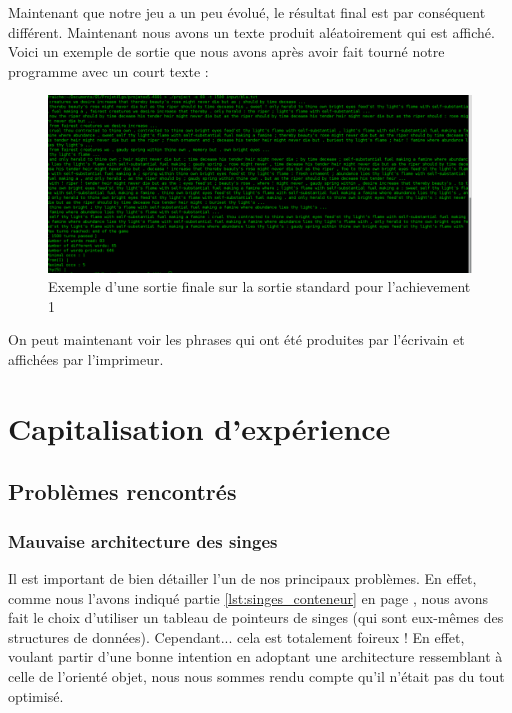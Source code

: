 \documentclass{article}
\begin{document}
Maintenant que notre jeu a un peu évolué, le résultat final est par conséquent différent. Maintenant nous avons un texte produit aléatoirement qui est affiché. Voici un exemple de sortie que nous avons après avoir fait tourné notre programme avec un court texte :

\begin{figure}[ht!]
\centering
\includegraphics[scale=0.28]{outputachiev1.png}
\caption{Exemple d'une sortie finale sur la sortie standard pour l'achievement 1}
\label{fig:output_achiev1}
\end{figure}

On peut maintenant voir les phrases qui ont été produites par l'écrivain et affichées par l'imprimeur.



\newpage
\section{Capitalisation d'expérience}
\label{sct:capitalisation}


\subsection{Problèmes rencontrés}
\label{subsct:problemes}


\subsubsection{Mauvaise architecture des singes}
\label{subsct:mauvaise_archi_singes}

Il est important de bien détailler l'un de nos principaux problèmes. En effet, comme nous l'avons indiqué partie \ref{lst:singes_conteneur} en page \pageref{lst:singes_conteneur}, nous avons fait le choix d'utiliser un tableau de pointeurs de singes (qui sont eux-mêmes des structures de données). Cependant... cela est totalement foireux ! En effet, voulant partir d'une bonne intention en adoptant une architecture ressemblant à celle de l'orienté objet, nous nous sommes rendu compte qu'il n'était pas du tout optimisé.
\end{document}
